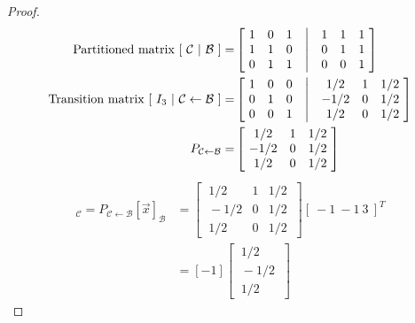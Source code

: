 \documentclass[../main.tex]{subfiles}
\begin{document}
\begin{proof}
        \begin{align*}
                \textrm{Partitioned matrix } [\ \mathcal{C}\ |\ \mathcal{B}\ ] =
                 & \begin{bmatrix}
                        \ 1 & 0 & 1 & \bigm| & 1 & 1 & 1 \ \\
                        \ 1 & 1 & 0 & \bigm| & 0 & 1 & 1 \ \\
                        \ 0 & 1 & 1 & \bigm| & 0 & 0 & 1 \
                \end{bmatrix} \\
                \textrm{Transition matrix } [\ I_3 \ |\ {\mathcal{C} \leftarrow \mathcal{B}}\ ] =
                 & \begin{bmatrix}
                        \ 1 & 0 & 0 & \bigm| & {1}/{2}  & 1 & {1}/{2} \ \\
                        \ 0 & 1 & 0 & \bigm| & -{1}/{2} & 0 & {1}/{2} \ \\
                        \ 0 & 0 & 1 & \bigm| & {1}/{2}  & 0 & {1}/{2} \
                \end{bmatrix} \\
                P_{\mathcal{C} \leftarrow \mathcal{B}} =
                 & \begin{bmatrix}
                        \ {1}/{2}  & 1 & {1}/{2} \ \\
                        \ -{1}/{2} & 0 & {1}/{2} \ \\
                        \ {1}/{2}  & 0 & {1}/{2} \
                \end{bmatrix}
        \end{align*}
        \begin{align*}
                [\vec{x}]_\mathcal{C} = P_{\mathcal{C} \leftarrow \mathcal{B}}[\vec{x}]_{\mathcal{B}}
                 & = \begin{bmatrix}
                        \ {1}/{2}  & 1 & {1}/{2} \ \\
                        \ -{1}/{2} & 0 & {1}/{2} \ \\
                        \ {1}/{2}  & 0 & {1}/{2} \
                \end{bmatrix}[\ -1 \ -1 \ 3\ ]^T \\
                 & = [-1]\begin{bmatrix}
                        \ {1}/{2} \ \\
                        \ -{1}/{2}\ \\
                        \ {1}/{2} \

\end{bmatrix}
\end{align*}
\end{proof}
\end{document}
